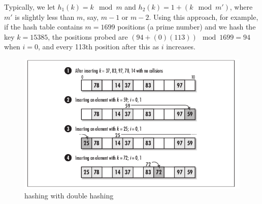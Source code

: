 \documentclass{article}
\begin{document}
    Typically, we let $h_1(k) = k \mod m$ and $h_2(k) = 1 + (k \mod m')$, where $m'$ is slightly less than $m$, say, $m - 1$ or $m - 2$. Using this approach, for example, if the hash table contains $m = 1699$ positions (a prime number) and we hash the key $k = 15385$, the positions probed are $(94 + (0)(113)) \mod 1699 = 94$ when $i = 0$, and every 113th position after this as $i$ increases.
    \begin{figure}[h]
    \centering
    \includegraphics[width=0.5\linewidth]{images/hash-tables-3}
    \caption{hashing with double hashing}
    \end{figure}
\end{document}
